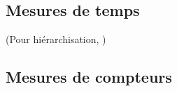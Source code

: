 \subsection{Mesures de temps}

(Pour hiérarchisation, \cite{Ths3,Ths4})


\subsection{Mesures de compteurs}

